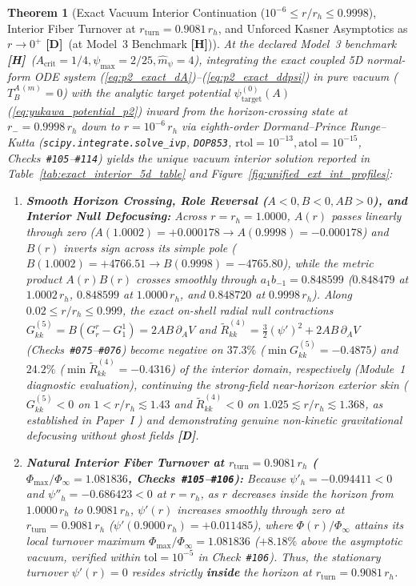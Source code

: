 \documentclass[11pt,a4paper]{article}
\newcommand{\catD}{\textbf{\textcolor{blue!75!black}{[D]}}}
\newcommand{\catH}{\textbf{\textcolor{orange!85!black}{[H]}}}
\theoremstyle{plain}
\newtheorem{theorem}{Theorem}[section]
\theoremstyle{definition}
\theoremstyle{remark}
\numberwithin{equation}{section}
\begin{document}
\begin{theorem}[Exact Vacuum Interior Continuation ($10^{-6} \le r/r_h \le 0.9998$), Interior Fiber Turnover at $r_{\text{turn}} = 0.9081\,r_h$, and Unforced Kasner Asymptotics as $r \to 0^+$ \catD\ (at Model~3 Benchmark \catH)]
\label{thm:exact_interior_continuation}
At the declared Model~3 benchmark \catH\ ($A_{\text{crit}} = 1/4, \psi_{\max} = 2/25, \hat{m}_{\psi} = 4$), integrating the exact coupled 5D normal-form ODE system (\ref{eq:p2_exact_dA})--(\ref{eq:p2_exact_ddpsi}) in pure vacuum ($T^{A\,(m)}_B = 0$) with the analytic target potential $\psi_{\text{target}}^{(0)}(A)$ (\ref{eq:yukawa_potential_p2}) inward from the horizon-crossing state at $r_- = 0.9998\,r_h$ down to $r = 10^{-6}\,r_h$ via eighth-order Dormand--Prince Runge--Kutta (\texttt{scipy.integrate.solve\_ivp}, \texttt{DOP853}, $\text{rtol} = 10^{-13}, \text{atol} = 10^{-15}$, Checks~\texttt{\#105}--\texttt{\#114}) yields the unique vacuum interior solution reported in Table~\ref{tab:exact_interior_5d_table} and Figure~\ref{fig:unified_ext_int_profiles}:
\begin{enumerate}
    \item[\textnormal{(i)}] \textbf{Smooth Horizon Crossing, Role Reversal ($A < 0, B < 0, A B > 0$), and Interior Null Defocusing:} Across $r = r_h = 1.0000$, $A(r)$ passes linearly through zero ($A(1.0002) = +0.000178 \to A(0.9998) = -0.000178$) and $B(r)$ inverts sign across its simple pole ($B(1.0002) = +4766.51 \to B(0.9998) = -4765.80$), while the metric product $A(r)B(r)$ crosses smoothly through $a_1 b_{-1} = 0.848599$ ($0.848479$ at $1.0002\,r_h$, $0.848599$ at $1.0000\,r_h$, and $0.848720$ at $0.9998\,r_h$). Along $0.02 \le r/r_h \le 0.999$, the exact on-shell radial null contractions $G^{(5)}_{kk} = B(G^r_r - G^1_1) = 2 A B\,\partial_A V$ and $\tilde{R}^{(4)}_{kk} = \frac{3}{2}(\psi')^2 + 2 A B\,\partial_A V$ (Checks~\texttt{\#075}--\texttt{\#076}) become negative on $37.3\%$ ($\min G^{(5)}_{kk} = -0.4875$) and $24.2\%$ ($\min \tilde{R}^{(4)}_{kk} = -0.4316$) of the interior domain, respectively (Module~1 diagnostic evaluation), continuing the strong-field near-horizon exterior skin ($G^{(5)}_{kk} < 0$ on $1 < r/r_h \lesssim 1.43$ and $\tilde{R}^{(4)}_{kk} < 0$ on $1.025 \lesssim r/r_h \lesssim 1.368$, as established in \textit{Paper~I} \cite{jimenez2026a}) and demonstrating genuine non-kinetic gravitational defocusing without ghost fields \catD.
    \item[\textnormal{(ii)}] \textbf{Natural Interior Fiber Turnover at $r_{\text{turn}} = 0.9081\,r_h$ ($\Phi_{\max}/\Phi_{\infty} = 1.081836$, Checks~\texttt{\#105}--\texttt{\#106}):} Because $\psi'_h = -0.094411 < 0$ and $\psi''_h = -0.686423 < 0$ at $r = r_h$, as $r$ decreases inside the horizon from $1.0000\,r_h$ to $0.9081\,r_h$, $\psi'(r)$ increases smoothly through zero at $r_{\text{turn}} = 0.9081\,r_h$ ($\psi'(0.9000\,r_h) = +0.011485$), where $\Phi(r)/\Phi_{\infty}$ attains its local turnover maximum $\Phi_{\max}/\Phi_{\infty} = \mathbf{1.081836}$ ($+8.18\%$ above the asymptotic vacuum, verified within $\text{tol} = 10^{-5}$ in Check~\texttt{\#106}). Thus, the stationary turnover $\psi'(r) = 0$ resides strictly \textbf{inside} the horizon at $r_{\text{turn}} = 0.9081\,r_h$.

\end{enumerate}
\end{theorem}
\end{document}
